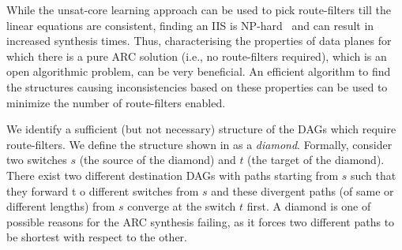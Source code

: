 

While the unsat-core learning approach can be
used to pick route-filters till the linear equations 
are consistent, finding an IIS is NP-hard~\cite{iiscomplexity}
and can result in increased synthesis times.
Thus, characterising the properties of data planes 
for which there is
a pure ARC solution (i.e., no route-filters
required), which is an open algorithmic
problem, can be very beneficial. An 
efficient algorithm to find the structures causing 
inconsistencies based on these properties 
can be used to minimize the number of route-filters enabled.

We identify a sufficient (but not 
necessary) structure of the DAGs which require 
route-filters. 
We define the structure shown in 
as a \emph{diamond}. Formally,
consider two switches $s$ (the source of the diamond) 
and $t$ (the target of the diamond).
There exist two different destination DAGs with 
paths starting from $s$ such that they forward t
o different switches from $s$  
and these divergent paths (of same or
different lengths) from $s$ converge
at the switch $t$ first. A diamond is 
one of possible reasons for the ARC synthesis 
failing, as it forces two different paths to be 
shortest with respect to the other. 

